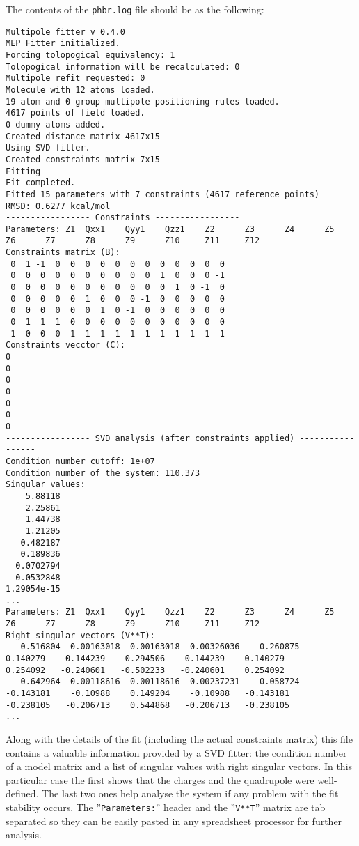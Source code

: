 \documentclass[10pt,a4paper]{article}
\begin{document}
The contents of the \lstinline{phbr.log} file should be as the following:
\begin{lstlisting}[style=file]
Multipole fitter v 0.4.0
MEP Fitter initialized.
Forcing tolopogical equivalency: 1
Tolopogical information will be recalculated: 0
Multipole refit requested: 0
Molecule with 12 atoms loaded.
19 atom and 0 group multipole positioning rules loaded.
4617 points of field loaded.
0 dummy atoms added.
Created distance matrix 4617x15
Using SVD fitter.
Created constraints matrix 7x15
Fitting
Fit completed.
Fitted 15 parameters with 7 constraints (4617 reference points)
RMSD: 0.6277 kcal/mol
----------------- Constraints -----------------
Parameters: Z1  Qxx1    Qyy1    Qzz1    Z2      Z3      Z4      Z5      Z6      Z7      Z8      Z9      Z10     Z11     Z12
Constraints matrix (B):
 0  1 -1  0  0  0  0  0  0  0  0  0  0  0  0
 0  0  0  0  0  0  0  0  0  0  1  0  0  0 -1
 0  0  0  0  0  0  0  0  0  0  0  1  0 -1  0
 0  0  0  0  0  1  0  0  0 -1  0  0  0  0  0
 0  0  0  0  0  0  1  0 -1  0  0  0  0  0  0
 0  1  1  1  0  0  0  0  0  0  0  0  0  0  0
 1  0  0  0  1  1  1  1  1  1  1  1  1  1  1
Constraints vecctor (C):
0
0
0
0
0
0
0
----------------- SVD analysis (after constraints applied) -----------------
Condition number cutoff: 1e+07
Condition number of the system: 110.373
Singular values:
    5.88118
    2.25861
    1.44738
    1.21205
   0.482187
   0.189836
  0.0702794
  0.0532848
1.29054e-15
...
Parameters: Z1  Qxx1    Qyy1    Qzz1    Z2      Z3      Z4      Z5      Z6      Z7      Z8      Z9      Z10     Z11     Z12
Right singular vectors (V**T):
   0.516804  0.00163018  0.00163018 -0.00326036    0.260875    0.140279   -0.144239   -0.294506   -0.144239    0.140279
0.254092   -0.240601   -0.502233   -0.240601    0.254092
   0.642964 -0.00118616 -0.00118616  0.00237231    0.058724   -0.143181    -0.10988    0.149204    -0.10988   -0.143181
-0.238105   -0.206713    0.544868   -0.206713   -0.238105
...
\end{lstlisting}
Along with the details of the fit (including the actual constraints matrix) 
this file contains a valuable information provided by a SVD
fitter: the condition number of a model matrix and a list of singular values with right
singular vectors. In this particular case the first shows that the charges and 
the quadrupole were well-defined. The
last two ones help analyse the system if any problem with the fit stability occurs. The
''\lstinline{Parameters:}'' header and the ''\lstinline{V**T}'' matrix are tab separated 
so they can
be easily pasted in any spreadsheet processor for further analysis. 
\end{document}
